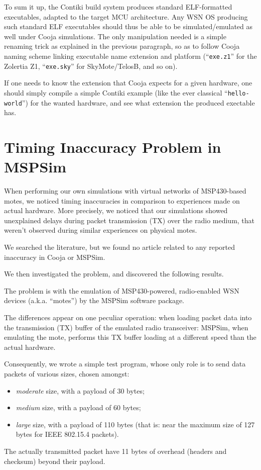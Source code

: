 \documentclass[10pt,emptycopyrightspace]{ewsn-proc}
\begin{document}
\medskip

To sum it up, the Contiki build system produces standard ELF-formatted
executables, adapted to the target MCU architecture. Any WSN OS producing
such standard ELF executables should thus be able to be simulated/emulated
as well under Cooja simulations. The only manipulation needed is a simple
renaming trick as explained in the previous paragraph, so as to follow
Cooja naming scheme linking executable name extension and platform
(``\texttt{exe.z1}'' for the Zolertia Z1, ``\texttt{exe.sky}'' for
SkyMote/TelosB, and so on).

If one needs to know the extension that Cooja expects for a given hardware,
one should simply compile a simple Contiki example (like the ever classical
``\texttt{hello-world}'')  for the wanted hardware, and see what extension
the produced exectable has.

\medskip


\section{Timing Inaccuracy Problem in MSPSim}
\label{results}

When performing our own simulations with virtual networks of MSP430-based
motes, we noticed timing inaccuracies in comparison to experiences made
on actual hardware. More precisely, we noticed that our simulations showed
unexplained delays during packet transmission (TX) over the radio medium,
that weren't observed during similar experiences on physical motes.

We searched the literature, but we found no article related to any reported
inaccuracy in Cooja or MSPSim.

We then investigated the problem, and discovered the following results.

The problem is with the emulation of MSP430-powered, radio-enabled WSN
devices (a.k.a. ``motes'') by the MSPSim software package.

The differences appear on one peculiar operation: when loading packet data
into the transmission (TX) buffer of the emulated radio transceiver:
MSPSim, when emulating the mote, performs this TX buffer loading at
a different speed than the actual hardware.

Consequently, we wrote a simple test program, whose only role is to send
data packets of various sizes, chosen amongst:
\begin{itemize}
\item \emph{moderate} size, with a payload of 30 bytes;
\item \emph{medium} size, with a payload of 60 bytes;
\item \emph{large} size, with a payload of 110 bytes (that is:
      near the maximum size of 127 bytes for IEEE 802.15.4 packets).
\end{itemize}
\smallskip
The actually transmitted packet have 11 bytes of overhead (headers and
checksum) beyond their payload.
\end{document}
